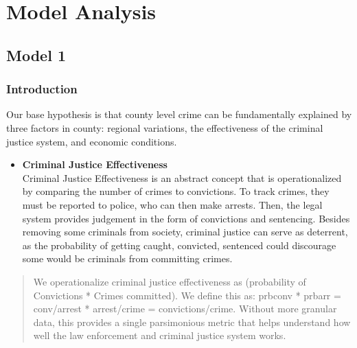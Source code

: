 \documentclass[]{article}
\providecommand{\tightlist}{%
  \setlength{\itemsep}{0pt}\setlength{\parskip}{0pt}}
\begin{document}
\hypertarget{model-analysis}{%
\section{Model Analysis}\label{model-analysis}}

\hypertarget{model-1}{%
\subsection{Model 1}\label{model-1}}

\hypertarget{introduction-1}{%
\subsubsection{Introduction}\label{introduction-1}}

Our base hypothesis is that county level crime can be fundamentally
explained by three factors in county: regional variations, the
effectiveness of the criminal justice system, and economic conditions.

\begin{itemize}
\tightlist
\item
  \textbf{Criminal Justice Effectiveness}\\
  Criminal Justice Effectiveness is an abstract concept that is
  operationalized by comparing the number of crimes to convictions. To
  track crimes, they must be reported to police, who can then make
  arrests. Then, the legal system provides judgement in the form of
  convictions and sentencing. Besides removing some criminals from
  society, criminal justice can serve as deterrent, as the probability
  of getting caught, convicted, sentenced could discourage some would be
  criminals from committing crimes.
\end{itemize}

\begin{quote}
We operationalize criminal justice effectiveness as (probability of
Convictions * Crimes committed). We define this as: prbconv * prbarr =
conv/arrest * arrest/crime = convictions/crime. Without more granular
data, this provides a single parsimonious metric that helps understand
how well the law enforcement and criminal justice system works.
\end{quote}
\end{document}
